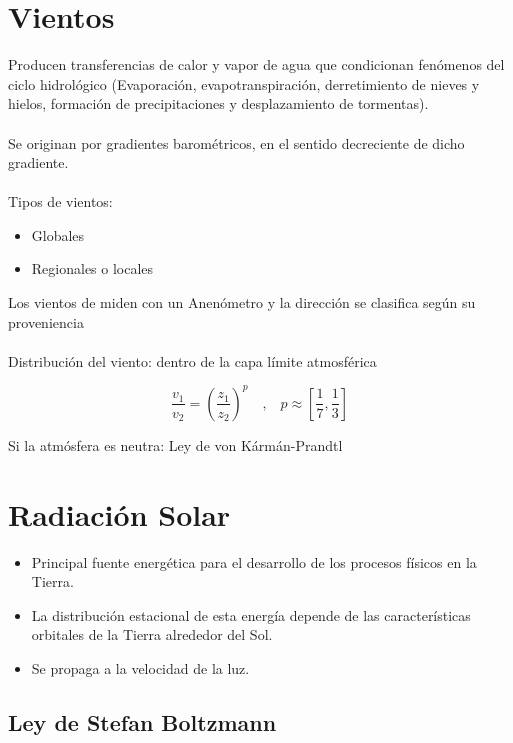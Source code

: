 \section{Vientos}

Producen transferencias de calor y vapor de agua que condicionan fenómenos del ciclo hidrológico (Evaporación, evapotranspiración, derretimiento de nieves y hielos, formación de precipitaciones y desplazamiento de tormentas).
\\\\
Se originan por gradientes barométricos, en el sentido decreciente de dicho gradiente.
\\\\
Tipos de vientos:
\begin{itemize}
    \item Globales
    \item Regionales o locales
\end{itemize}

Los vientos de miden con un Anenómetro y la dirección se clasifica según su proveniencia
\\\\
Distribución del viento: dentro de la capa límite atmosférica

\begin{equation}
    \frac{v_1}{v_2} = \left(\frac{z_1}{z_2}\right)^p \quad \text{,} \quad p \approx \left[\frac{1}{7}, \frac{1}{3}\right]
\end{equation}

Si la atmósfera es neutra: Ley de von Kármán-Prandtl

\section{Radiación Solar}

\begin{itemize}
    \item Principal fuente energética para el desarrollo de los procesos físicos en la Tierra.
    \item La distribución estacional de esta energía depende de las características orbitales de la Tierra alrededor del Sol.
    \item Se propaga a la velocidad de la luz.
\end{itemize}

\subsection{Ley de Stefan Boltzmann}

